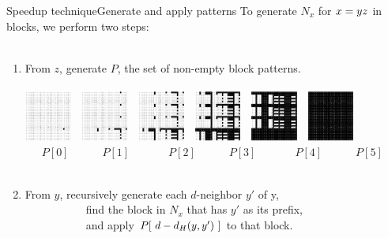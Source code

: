 \documentclass[pdf,xcolor={dvipsnames}]{beamer}
\begin{document}
	\begin{frame}{Speedup technique}{Generate and apply patterns}
		To generate $N_x$ for $x={\color{black}y}{\color{black}z}$ in blocks, we perform two steps:\\\ \\
		\begin{enumerate}
		\item From {\color{black} $z$}, generate $P$, the set of non-empty block patterns.\\\ \\
		\includegraphics[width=0.12\textwidth]{img/0.png}\ \ 
		\includegraphics[width=0.12\textwidth]{img/1.png}\ \ 
		\includegraphics[width=0.12\textwidth]{img/2.png}\ \ 
		\includegraphics[width=0.12\textwidth]{img/3.png}\ \ 
		\includegraphics[width=0.12\textwidth]{img/4.png}\ \ 
		\includegraphics[width=0.12\textwidth]{img/5.png}\ \ 
		\\
		\ \ \ $P[0]$\ \ \ 
		\ \ \ $P[1]$\ \ \ \
		\ \ \ $P[2]$\ \ \
		\ \ \ $P[3]$\ \ \ \  
		\ \ \ $P[4]$\ \ \ 
		\ \ \ $P[5]$
		\\\ \\
		\item From {\color{black} $y$}, recursively generate each $d$-neighbor $y'$ of y,
		\\\ \ \ \ \ \ \ \ \ \ \ find the block in $N_x$ that has $y'$ as its prefix,
		\\\ \ \ \ \ \ \ \ \ \ \ and apply $P[\ {\color{black}d - d_H(y,y')}\ ] $ to that block.
		\end{enumerate}
	\end{frame}
\end{document}
